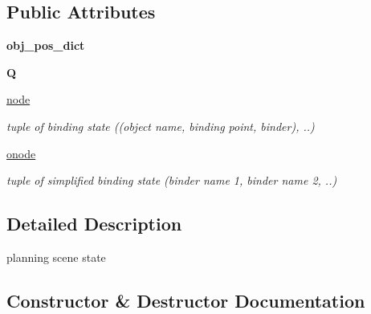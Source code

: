 \subsection*{Public Attributes}
\begin{DoxyCompactItemize}
\item 
\mbox{\label{classrnb-planning_1_1src_1_1pkg_1_1planning_1_1scene_1_1_state_af208e5443b73ed701aef40bbf383d413}} 
{\bfseries obj\+\_\+pos\+\_\+dict}
\item 
\mbox{\label{classrnb-planning_1_1src_1_1pkg_1_1planning_1_1scene_1_1_state_ada19852c5bddcdd705d4b65c53974b8b}} 
{\bfseries Q}
\item 
\mbox{\label{classrnb-planning_1_1src_1_1pkg_1_1planning_1_1scene_1_1_state_a966f7f8c0a6c3d01869cfa1045b11cd7}} 
\hyperlink{classrnb-planning_1_1src_1_1pkg_1_1planning_1_1scene_1_1_state_a966f7f8c0a6c3d01869cfa1045b11cd7}{node}
\begin{DoxyCompactList}\small\item\em tuple of binding state ((object name, binding point, binder), ..) \end{DoxyCompactList}\item 
\mbox{\label{classrnb-planning_1_1src_1_1pkg_1_1planning_1_1scene_1_1_state_ae5e260a23c7fad602873f3f465758108}} 
\hyperlink{classrnb-planning_1_1src_1_1pkg_1_1planning_1_1scene_1_1_state_ae5e260a23c7fad602873f3f465758108}{onode}
\begin{DoxyCompactList}\small\item\em tuple of simplified binding state (binder name 1, binder name 2, ..) \end{DoxyCompactList}\end{DoxyCompactItemize}


\subsection{Detailed Description}
planning scene state 

\subsection{Constructor \& Destructor Documentation}
\mbox{\label{classrnb-planning_1_1src_1_1pkg_1_1planning_1_1scene_1_1_state_a1dce175a04c69a1f2648025b161ce8bc}} 
